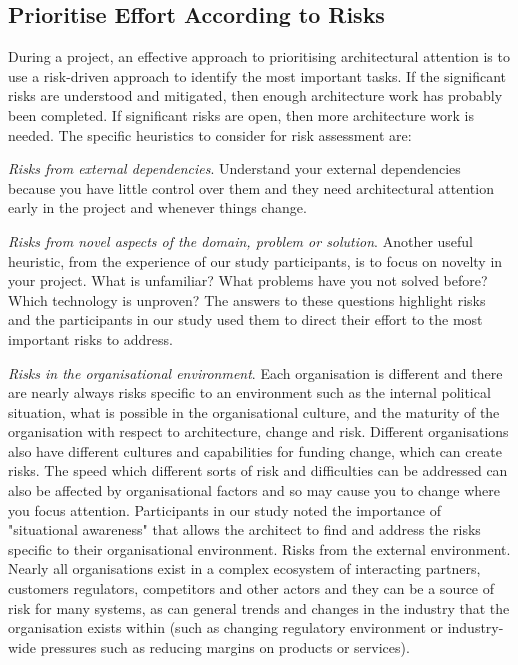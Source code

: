 \subsection{Prioritise Effort According to Risks}

During a project, an effective approach to prioritising architectural attention is to use a risk-driven approach to identify the most important tasks.  If the significant risks are understood and mitigated, then enough architecture work has probably been completed.  If significant risks are open, then more architecture work is needed. The specific heuristics to consider for risk assessment are:

\begin{description}
	\item \emph{Risks from external dependencies}.  Understand your external dependencies because you have little control over them and they need architectural attention early in the project and whenever things change.
	\item \emph{Risks from novel aspects of the domain, problem or solution}.  Another useful heuristic, from the experience of our study participants, is to focus on novelty in your project.  What is unfamiliar?  What problems have you not solved before?  Which technology is unproven? The answers to these questions highlight risks and the participants in our study used them to direct their effort to the most important risks to address.
	\item \emph{Risks in the organisational environment}.  Each organisation is different and there are nearly always risks specific to an environment such as the internal political situation, what is possible in the organisational culture, and the maturity of the organisation with respect to architecture, change and risk.  Different organisations also have different cultures and capabilities for funding change, which can create risks.  The speed which different sorts of risk and difficulties can be addressed can also be affected by organisational factors and so may cause you to change where you focus attention.  Participants in our study noted the importance of "situational awareness" \cite{wikipedia-sitawareness} that allows the architect to find and address the risks specific to their organisational environment.
	Risks from the external environment.  Nearly all organisations exist in a complex ecosystem of interacting partners, customers regulators, competitors and other actors and they can be a source of risk for many systems, as can general trends and changes in the industry that the organisation exists within (such as changing regulatory environment or industry-wide pressures such as reducing margins on products or services). 

\end{description}
